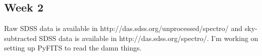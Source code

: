 \documentclass[12pt]{article}
\begin{document}
\subsection*{Week 2}
Raw SDSS data is available in http://das.sdss.org/unprocessed/spectro/ and sky-subtracted SDSS data is available in http://das.sdss.org/spectro/.  I'm working on setting up PyFITS to read the damn things.
\end{document}
